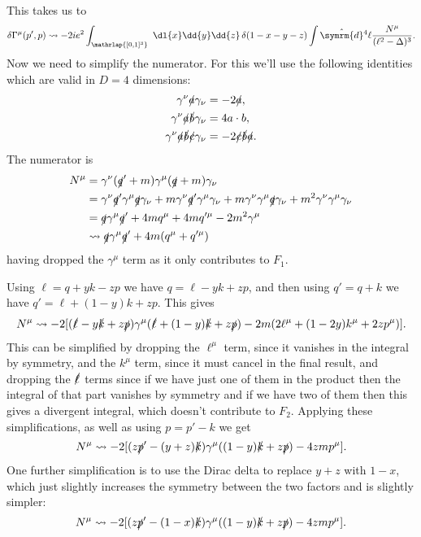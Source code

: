 \documentclass[fleqn]{NotesClass}
\newcommand{\dhat}[1]{\hat{\symrm{d}}{#1}}
\begin{document}
    This takes us to
    \begin{equation}
        \delta\Gamma^\mu(p', p) \rightsquigarrow -2ie^2 \int_{\mathrlap{[0, 1]^3}} \  \dl{x} \dd{y} \dd{z} \, \delta(1 - x - y - z) \int \dhat{^4\ell} \frac{N^\mu}{(\ell^2 - \Delta)^3}.
    \end{equation}
    Now we need to simplify the numerator.
    For this we'll use the following identities which are valid in \(D = 4\) dimensions:
    \begin{align}
        \gamma^\nu \slashed{a} \gamma_\nu &= -2\slashed{a},\\
        \gamma^\nu \slashed{a} \slashed{b} \gamma_\nu &= 4 a \cdot b,\\
        \gamma^\nu \slashed{a} \slashed{b} \slashed{c} \gamma_\nu &= -2\slashed{c}\slashed{b}\slashed{a}.
    \end{align}
    The numerator is
    \begin{align}
        N^\mu &= \gamma^\nu(\slashed{q}' + m)\gamma^\mu(\slashed{q} + m)\gamma_\nu\\
        &= \gamma^\nu\slashed{q}'\gamma^\mu\slashed{q}\gamma_\nu + m\gamma^\nu\slashed{q}'\gamma^\mu\gamma_\nu + m\gamma^\nu\gamma^\mu\slashed{q}\gamma_\nu + m^2\gamma^\nu\gamma^\mu\gamma_\nu\\
        &= \slashed{q} \gamma^\mu \slashed{q}' + 4mq^\mu + 4mq'^\mu - 2m^2\gamma^\mu\\
        &\rightsquigarrow \slashed{q}\gamma^\mu\slashed{q}' + 4m(q^\mu + q'^\mu)
    \end{align}
    having dropped the \(\gamma^\mu\) term as it only contributes to \(F_1\).
    
    Using \(\ell = q + yk - zp\) we have \(q = \ell - yk + zp\), and then using \(q' = q + k\) we have \(q' = \ell + (1 - y)k + zp\).
    This gives
    \begin{equation}
        N^\mu \rightsquigarrow -2[(\slashed{\ell} - y\slashed{k} + z\slashed{p})\gamma^\mu(\slashed{\ell} + (1 - y)\slashed{k} + z\slashed{p}) - 2m(2\ell^\mu + (1 - 2y)k^\mu + 2zp^\mu)].
    \end{equation}
    This can be simplified by dropping the \(\ell^\mu\) term, since it vanishes in the integral by symmetry, and the \(k^\mu\) term, since it must cancel in the final result, and dropping the \(\slashed{\ell}\) terms since if we have just one of them in the product then the integral of that part vanishes by symmetry and if we have two of them then this gives a divergent integral, which doesn't contribute to \(F_2\).
    Applying these simplifications, as well as using \(p = p' - k\) we get
    \begin{equation}
        N^\mu \rightsquigarrow -2[(z\slashed{p}' - (y + z)\slashed{k})\gamma^\mu((1 - y)\slashed{k} + z\slashed{p}) - 4zmp^\mu].
    \end{equation}
    One further simplification is to use the Dirac delta to replace \(y + z\) with \(1 - x\), which just slightly increases the symmetry between the two factors and is slightly simpler:
    \begin{equation}
        N^\mu \rightsquigarrow -2[(z\slashed{p}' - (1 - x)\slashed{k})\gamma^\mu((1 - y)\slashed{k} + z\slashed{p}) - 4zmp^\mu].
    \end{equation}
    
\end{document}
